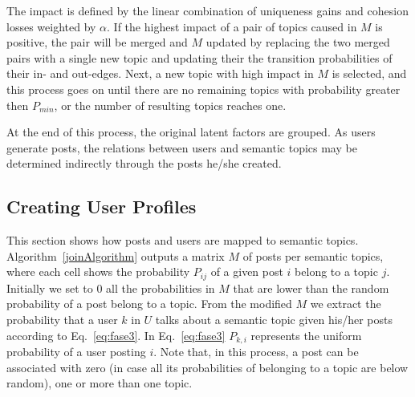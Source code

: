 The impact is defined by the linear combination of uniqueness gains and
cohesion losses weighted by $\alpha$.  If the highest impact of a pair of
topics caused in $M$ is positive, the pair will be merged and $M$ updated by
replacing the two merged pairs with a single new topic and updating their the
transition probabilities of their in- and out-edges. Next, a new topic with
high impact in $M$ is selected, and this process goes on until there are no
remaining topics with probability greater then $P_{min}$, or the number of
resulting topics reaches one. 




At the end of this process, the original latent factors are grouped. As users
generate posts, the relations between users and semantic topics may
be determined indirectly through the posts he/she created.

\subsection{Creating User Profiles}

This section shows how posts and users are mapped to semantic topics.  
Algorithm~\ref{joinAlgorithm} outputs a matrix $M$ of
posts per semantic topics, where each cell shows the probability $P_{ij}$ of a
given post $i$ belong to a topic $j$.  Initially we set to 0 all the
probabilities in $M$ that are lower than the random probability of a post
belong to a topic.  From the modified $M$ we extract the probability that a user
$k$ in $U$ talks about a semantic topic given his/her posts according to
Eq.~\ref{eq:fase3}.  In Eq.~\ref{eq:fase3} $P_{k,i}$ represents the uniform
probability of a user posting $i$.  Note that, in this process, a post can be
associated with zero (in case all its probabilities of belonging to a topic
are below random), one or more than one topic.

